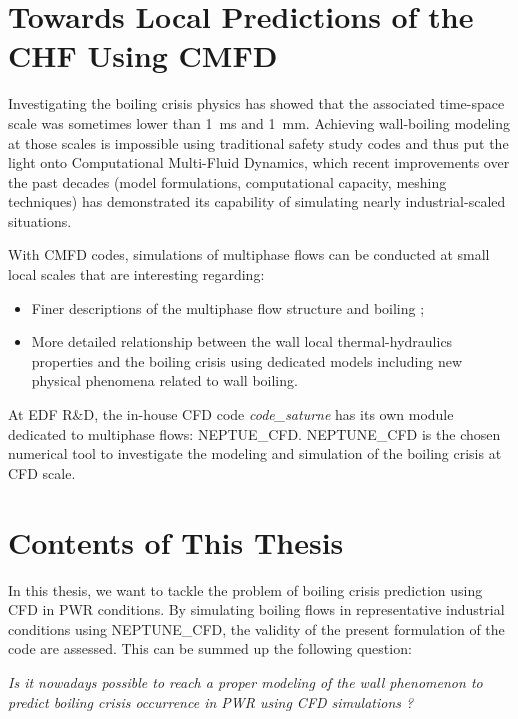 \section{Towards Local Predictions of the CHF Using CMFD}

Investigating the boiling crisis physics has showed that the associated time-space scale was sometimes lower than 1\ ms and 1\ mm. Achieving wall-boiling modeling at those scales is impossible using traditional safety study codes and thus put the light onto Computational Multi-Fluid Dynamics, which recent improvements over the past decades (model formulations, computational capacity, meshing techniques) has demonstrated its capability of simulating nearly industrial-scaled situations.

\npar

With CMFD codes, simulations of multiphase flows can be conducted at small local scales that are interesting regarding:
\begin{itemize}
\item Finer descriptions of the multiphase flow structure and boiling ;\
\item More detailed relationship between the wall local thermal-hydraulics properties and the boiling crisis using dedicated models including new physical phenomena related to wall boiling.
\end{itemize} 

At EDF R\&D, the in-house CFD code \textit{code\_saturne} has its own module dedicated to multiphase flows: NEPTUE\_CFD. NEPTUNE\_CFD is the chosen numerical tool to investigate the modeling and simulation of the boiling crisis at CFD scale.


\section{Contents of This Thesis}

In this thesis, we want to tackle the problem of boiling crisis prediction using CFD in PWR conditions. By simulating boiling flows in representative industrial conditions using NEPTUNE\_CFD, the validity of the present formulation of the code are assessed. This can be summed up the following question:

\npar

\textit{Is it nowadays possible to reach a proper modeling of the wall phenomenon to predict boiling crisis occurrence in PWR using CFD simulations ?}

\npar

